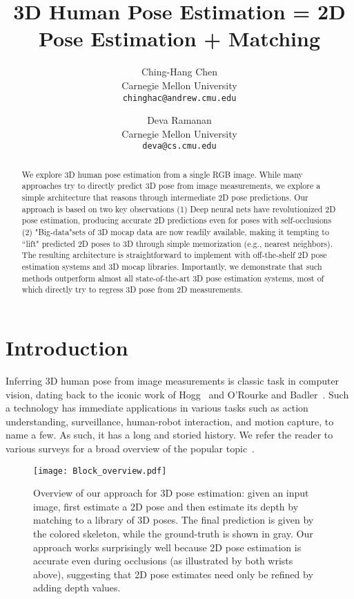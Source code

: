 \documentclass[10pt,twocolumn,letterpaper]{article}
\begin{document}
\title{3D Human Pose Estimation = 2D Pose Estimation + Matching}

\author{Ching-Hang Chen\\
Carnegie Mellon University\\
{\tt\small chinghac@andrew.cmu.edu}
\and
Deva Ramanan\\
Carnegie Mellon University\\
{\tt\small deva@cs.cmu.edu}
}

\maketitle


\begin{abstract}
We explore 3D human pose estimation from a single RGB image. While many approaches try to directly predict 3D pose from image measurements, we explore a simple architecture that reasons through intermediate 2D pose predictions. Our approach is based on two key observations (1) Deep neural nets have revolutionized 2D pose estimation, producing accurate 2D predictions even for poses with self-occlusions (2) "Big-data"sets of 3D mocap data are now readily available, making it tempting to ``lift" predicted 2D poses to 3D through simple memorization (e.g., nearest neighbors). The resulting architecture is straightforward to implement with off-the-shelf 2D pose estimation systems and 3D mocap libraries. Importantly, we demonstrate that such methods outperform almost all state-of-the-art 3D pose estimation systems, most of which directly try to regress 3D pose from 2D measurements.
\end{abstract}

\section{Introduction}
Inferring 3D human pose from image measurements is classic task in computer vision, dating back to the iconic work of Hogg~\cite{hogg1983model} and O'Rourke and Badler~\cite{o1980model}. Such a technology has immediate applications in various tasks such as action understanding, surveillance, human-robot interaction, and motion capture, to name a few. As such, it has a long and storied history. We refer the reader to various surveys for a broad overview of the popular topic~\cite{forsyth2006computational,moeslund2001survey}.

\begin{figure}[t!]
\centering
\texttt{[image: Block\_overview.pdf]}
   \caption{Overview of our approach for 3D pose estimation: given an input image, first estimate a 2D pose and then estimate its depth by matching to a library of 3D poses.  The final prediction is given by the colored skeleton, while the ground-truth is shown in gray. Our approach works surprisingly well because 2D pose estimation is accurate even during occlusions (as illustrated by both wrists above), suggesting that 2D pose estimates need only be refined by adding depth values.}
\label{fig:overview}
\end{figure}
\end{document}
